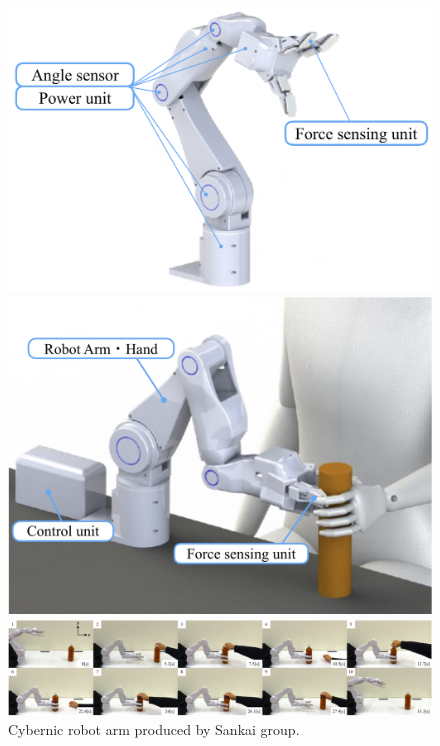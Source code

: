 \begin{figure}[H]
    \centering
    \begin{minipage}{0.49\hsize}
        \centering
        \includegraphics[width=\linewidth]{figure/chapter1/cybernic_arm_2017-2}
    \end{minipage}
    \begin{minipage}{0.49\hsize}
        \centering
        \includegraphics[width=\linewidth]{figure/chapter1/cybernic_arm_2017-1}
    \end{minipage}
    \begin{minipage}{\hsize}
        \centering
        \includegraphics[width=\linewidth]{figure/chapter1/cybernic_arm_2019-3}
    \end{minipage}
    \caption[Cybernic robot arm produced by Sankai group.]{Cybernic robot arm produced by Sankai group\cite{Sankai2017, Sankai2019}.}
    \label{fig:cybernicarm}
\end{figure}


